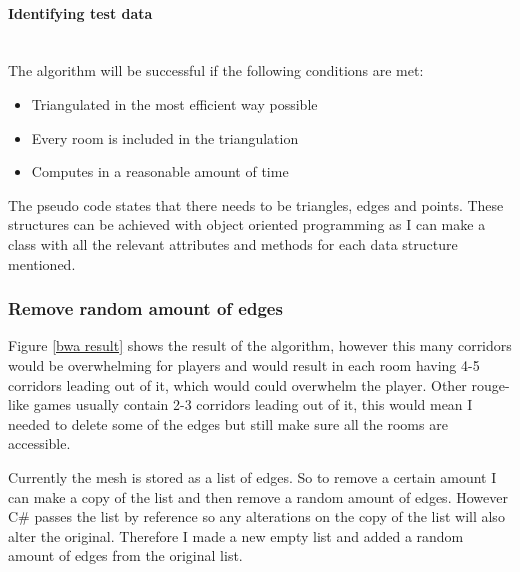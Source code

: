 \documentclass{article}
\newcommand{\parBr}{\vspace{5mm}}%
\newcommand{\myparagraph}[1]{\paragraph{#1}\mbox{}\\} %
\begin{document}
\myparagraph{Identifying test data}
The algorithm will be successful if the following conditions are met:
\begin{itemize}
\item{Triangulated in the most efficient way possible}
\item{Every room is included in the triangulation}
\item{Computes in a reasonable amount of time}
\end{itemize}

\parBr
The pseudo code states that there needs to be triangles, edges and points. These structures can be achieved with object oriented programming as I can make a class with all the relevant attributes and methods for each data structure mentioned.

\subsubsection{Remove random amount of edges}
Figure \ref{bwa result} shows the result of the algorithm, however this many corridors would be overwhelming for players and would result in each room having 4-5 corridors leading out of it, which would could overwhelm the player. Other rouge-like games usually contain 2-3 corridors leading out of it, this would mean I needed to delete some of the edges but still make sure all the rooms are accessible.

\parBr

Currently the mesh is stored as a list of edges. So to remove a certain amount I can make a copy of the list and then remove a random amount of edges. However C\# passes the list by reference so any alterations on the copy of the list will also alter the original. Therefore I made a new empty list and added a random amount of edges from the original list.
\end{document}

